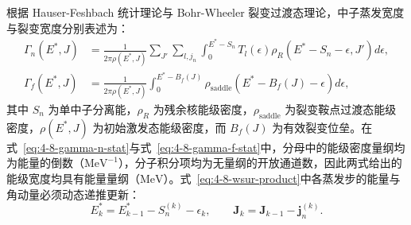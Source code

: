 \begin{enumerate}
根据 Hauser-Feshbach 统计理论与 Bohr-Wheeler 裂变过渡态理论，中子蒸发宽度与裂变宽度分别表述为：
\begin{align}
\Gamma_n(E^*, J) &= \frac{1}{2\pi \rho(E^*, J)} \sum_{J'} \sum_{l, j_n} \int_0^{E^* - S_n} T_l(\epsilon) \rho_R(E^* - S_n - \epsilon, J') d\epsilon, \label{eq:4-8-gamma-n-stat}\\
\Gamma_f(E^*, J) &= \frac{1}{2\pi \rho(E^*, J)} \int_0^{E^* - B_f(J)} \rho_{\mathrm{saddle}}(E^* - B_f(J) - \epsilon) d\epsilon, \label{eq:4-8-gamma-f-stat}
\end{align}
其中 $S_n$ 为单中子分离能，$\rho_R$ 为残余核能级密度，$\rho_{\mathrm{saddle}}$ 为裂变鞍点过渡态能级密度，$\rho(E^*, J)$ 为初始激发态能级密度，而 $B_f(J)$ 为有效裂变位垒。在式~\eqref{eq:4-8-gamma-n-stat}与式~\eqref{eq:4-8-gamma-f-stat}中，分母中的能级密度量纲均为能量的倒数（$\mathrm{MeV}^{-1}$），分子积分项均为无量纲的开放通道数，因此两式给出的能级宽度均具有能量量纲（$\mathrm{MeV}$）。式~\eqref{eq:4-8-wsur-product}中各蒸发步的能量与角动量必须动态递推更新：
\begin{equation}\label{eq:4-8-stepwise-dyn-update}
E_k^* = E_{k-1}^* - S_n^{(k)} - \epsilon_k, \qquad \mathbf{J}_k = \mathbf{J}_{k-1} - \mathbf{j}_n^{(k)}.
\end{equation}
\end{enumerate}

